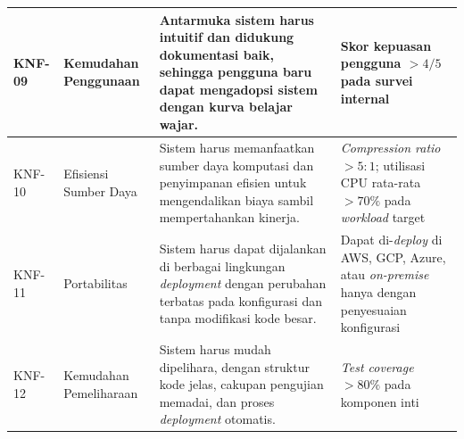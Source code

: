 {\begin{longtable}{|>{\centering\arraybackslash}m{1cm}|m{2.5cm}|m{6cm}|m{3cm}|}
\hline
KNF-09 & Kemudahan Penggunaan & Antarmuka sistem harus intuitif dan didukung dokumentasi baik, sehingga pengguna baru dapat mengadopsi sistem dengan kurva belajar wajar. & Skor kepuasan pengguna $> 4/5$ pada survei internal \\
\hline
KNF-10 & Efisiensi Sumber Daya & Sistem harus memanfaatkan sumber daya komputasi dan penyimpanan efisien untuk mengendalikan biaya sambil mempertahankan kinerja. & \textit{Compression ratio} $> 5{:}1$; utilisasi CPU rata-rata $> 70\%$ pada \textit{workload} target \\
\hline
KNF-11 & Portabilitas & Sistem harus dapat dijalankan di berbagai lingkungan \textit{deployment} dengan perubahan terbatas pada konfigurasi dan tanpa modifikasi kode besar. & Dapat di-\textit{deploy} di AWS, GCP, Azure, atau \textit{on-premise} hanya dengan penyesuaian konfigurasi \\
\hline
KNF-12 & Kemudahan Pemeliharaan & Sistem harus mudah dipelihara, dengan struktur kode jelas, cakupan pengujian memadai, dan proses \textit{deployment} otomatis. & \textit{Test coverage} $> 80\%$ pada komponen inti \\
\hline
\end{longtable}
}